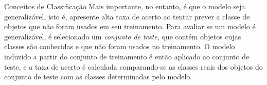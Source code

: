 \begin{section}{Conceitos de Classificação}
	Mais importante, no entanto, é que o modelo seja generalizável, isto é, apresente alta taxa de acerto ao tentar prever a classe de objetos que não foram usados em seu treinamento. Para avaliar se um modelo é generalizável, é selecionado um \emph{conjunto de teste}, que contém objetos cujas classes são conhecidas e que não foram usados no treinamento. O modelo induzido a partir do conjunto de treinamento é então aplicado ao conjunto de teste, e a taxa de acerto é calculada comparando-se as classes reais dos objetos do conjunto de teste com as classes determinadas pelo modelo.
	
	
\end{section}	
	
